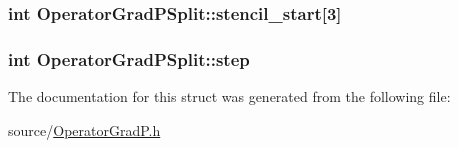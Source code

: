 \subsubsection[{stencil\+\_\+start}]{\setlength{\rightskip}{0pt plus 5cm}int Operator\+Grad\+P\+Split\+::stencil\+\_\+start\mbox{[}3\mbox{]}}\label{struct_operator_grad_p_split_a53e3860439ef1e9344117f7e31f51ecc}
\hypertarget{struct_operator_grad_p_split_a3c2c3f52bff9a44096d838acd2ad396b}{}
\subsubsection[{step}]{\setlength{\rightskip}{0pt plus 5cm}int Operator\+Grad\+P\+Split\+::step}\label{struct_operator_grad_p_split_a3c2c3f52bff9a44096d838acd2ad396b}


The documentation for this struct was generated from the following file\+:\begin{DoxyCompactItemize}
\item 
source/\hyperlink{_operator_grad_p_8h}{Operator\+Grad\+P.\+h}\end{DoxyCompactItemize}

